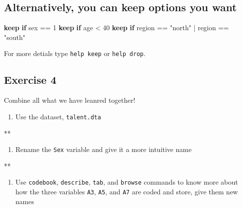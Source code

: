 \documentclass[
]{book}
\newenvironment{Shaded}{\begin{snugshade}}{\end{snugshade}}
\newcommand{\KeywordTok}[1]{\textcolor[rgb]{0.13,0.29,0.53}{\textbf{#1}}}
\newcommand{\NormalTok}[1]{#1}
\newcommand{\StringTok}[1]{\textcolor[rgb]{0.31,0.60,0.02}{#1}}
\providecommand{\tightlist}{%
  \setlength{\itemsep}{0pt}\setlength{\parskip}{0pt}}
\begin{document}
\hypertarget{alternatively-you-can-keep-options-you-want}{%
\subsection{Alternatively, you can keep options you want}\label{alternatively-you-can-keep-options-you-want}}

\begin{Shaded}
\begin{Highlighting}[]
\KeywordTok{keep} \KeywordTok{if}\NormalTok{ sex == 1}
\KeywordTok{keep} \KeywordTok{if}\NormalTok{ age < 40}
\KeywordTok{keep} \KeywordTok{if}\NormalTok{ region == }\StringTok{"north"}\NormalTok{ | region == }\StringTok{"south"}
\end{Highlighting}
\end{Shaded}

For more detials type \texttt{help\ keep} or \texttt{help\ drop}.

\hypertarget{exercise-4-2}{%
\subsection{Exercise 4}\label{exercise-4-2}}

Combine all what we have leanred together!

\begin{enumerate}
\def\labelenumi{\arabic{enumi}.}
\tightlist
\item
  Use the dataset, \texttt{talent.dta}
\end{enumerate}

\begin{Shaded}
\begin{Highlighting}[]
\NormalTok{**}
\end{Highlighting}
\end{Shaded}

\begin{enumerate}
\def\labelenumi{\arabic{enumi}.}
\setcounter{enumi}{1}
\tightlist
\item
  Rename the \texttt{Sex} variable and give it a more intuitive name
\end{enumerate}

\begin{Shaded}
\begin{Highlighting}[]
\NormalTok{**}
\end{Highlighting}
\end{Shaded}

\begin{enumerate}
\def\labelenumi{\arabic{enumi}.}
\setcounter{enumi}{2}
\tightlist
\item
  Use \texttt{codebook}, \texttt{describe}, \texttt{tab}, and \texttt{browse} commands to know more about how the three variables \texttt{A3}, \texttt{A5}, and \texttt{A7} are coded and store, give them new names
\end{enumerate}
\end{document}
